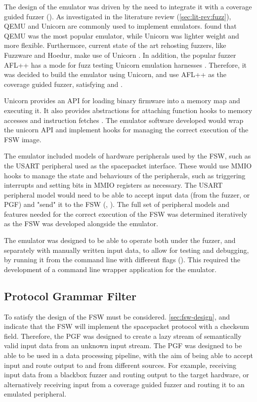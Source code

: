 \documentclass[../report.tex]{subfiles}
\begin{document}
The design of the emulator was driven by the need to integrate it with a
coverage guided fuzzer (). As investigated in the literature
review (\autoref{sec:lit-rev:fuzz}), QEMU and Unicorn are commonly used to
implement emulators. \citet{Yun_2022} found that QEMU was the most popular
emulator, while Unicorn was lighter weight and more flexible. Furthermore,
current state of the art rehosting fuzzers, like Fuzzware and Hoedur, make use
of Unicorn \citep{Fuzzware_2022, Hoedur_2023}. In addition, the popular fuzzer
AFL++ has a mode for fuzz testing Unicorn emulation harnesses
\citep{UnicornMode}. Therefore, it was decided to build the emulator using
Unicorn, and use AFL++ as the coverage guided fuzzer, satisfying
 and .

Unicorn provides an API for loading binary firmware into a memory map and
executing it. It also provides abstractions for attaching function hooks to
memory accesses and instruction fetches \citep{Unicorn}. The emulator software
developed would wrap the unicorn API and implement hooks for managing the
correct execution of the FSW image.

The emulator included models of hardware peripherals used by the FSW, such as
the USART peripheral used as the spacepacket interface. These would use MMIO
hooks to manage the state and behaviours of the peripherals, such as triggering
interrupts and setting bits in MMIO registers as necessary. The USART
peripheral model would need to be able to accept input data (from the fuzzer,
or PGF) and "send" it to the FSW (, ). The full set
of peripheral models and features needed for the correct execution of the FSW
was determined iteratively as the FSW was developed alongside the emulator.

The emulator was designed to be able to operate both under the fuzzer, and
separately with manually written input data, to allow for testing and
debugging, by running it from the command line with different flags
(). This required the development of a command line wrapper
application for the emulator.

\subsection{Protocol Grammar Filter}

To satisfy  the design of the FSW must be considered.
\autoref{sec:fsw-design},  and  indicate that the
FSW will implement the spacepacket protocol with a checksum field. Therefore,
the PGF was designed to create a lazy stream of semantically valid input data
from an unknown input stream. The PGF was designed to be able to be used in a
data processing pipeline, with the aim of being able to accept input and route
output to and from different sources. For example, receiving input data from a
blackbox fuzzer and routing output to the target hardware, or alternatively
receiving input from a coverage guided fuzzer and routing it to an emulated
peripheral.
\end{document}
